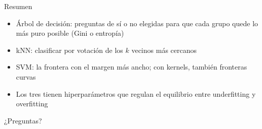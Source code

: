 \begin{frame}{Resumen}
  \begin{itemize}
    \item Árbol de decisión: preguntas de sí o no elegidas para que cada
      grupo quede lo más puro posible (Gini o entropía)
    \item kNN: clasificar por votación de los $k$ vecinos más cercanos
    \item SVM: la frontera con el margen más ancho; con kernels, también
      fronteras curvas
    \item Los tres tienen hiperparámetros que regulan el equilibrio entre
      underfitting y overfitting
  \end{itemize}
  \vspace{1em}
  \centering
  \Large ¿Preguntas?
\end{frame}


